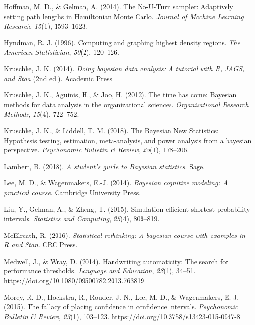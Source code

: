 \documentclass[,man,floatsintext]{apa6}
\begin{document}
\leavevmode\hypertarget{ref-hoffman2014no}{}%
Hoffman, M. D., \& Gelman, A. (2014). The No-U-Turn sampler: Adaptively setting path lengths in Hamiltonian Monte Carlo. \emph{Journal of Machine Learning Research}, \emph{15}(1), 1593--1623.

\leavevmode\hypertarget{ref-hyndman1996computing}{}%
Hyndman, R. J. (1996). Computing and graphing highest density regions. \emph{The American Statistician}, \emph{50}(2), 120--126.

\leavevmode\hypertarget{ref-kruschke2014doing}{}%
Kruschke, J. K. (2014). \emph{Doing bayesian data analysis: A tutorial with R, JAGS, and Stan} (2nd ed.). Academic Press.

\leavevmode\hypertarget{ref-kruschke2012time}{}%
Kruschke, J. K., Aguinis, H., \& Joo, H. (2012). The time has come: Bayesian methods for data analysis in the organizational sciences. \emph{Organizational Research Methods}, \emph{15}(4), 722--752.

\leavevmode\hypertarget{ref-kruschke2018bayesian}{}%
Kruschke, J. K., \& Liddell, T. M. (2018). The Bayesian New Statistics: Hypothesis testing, estimation, meta-analysis, and power analysis from a bayesian perspective. \emph{Psychonomic Bulletin \& Review}, \emph{25}(1), 178--206.

\leavevmode\hypertarget{ref-lambert2018student}{}%
Lambert, B. (2018). \emph{A student's guide to Bayesian statistics}. Sage.

\leavevmode\hypertarget{ref-lee2014bayesian}{}%
Lee, M. D., \& Wagenmakers, E.-J. (2014). \emph{Bayesian cognitive modeling: A practical course}. Cambridge University Press.

\leavevmode\hypertarget{ref-liu2015simulation}{}%
Liu, Y., Gelman, A., \& Zheng, T. (2015). Simulation-efficient shortest probability intervals. \emph{Statistics and Computing}, \emph{25}(4), 809--819.

\leavevmode\hypertarget{ref-mcelreath2016statistical}{}%
McElreath, R. (2016). \emph{Statistical rethinking: A bayesian course with examples in R and Stan}. CRC Press.

\leavevmode\hypertarget{ref-medwell2014handwriting}{}%
Medwell, J., \& Wray, D. (2014). Handwriting automaticity: The search for performance thresholds. \emph{Language and Education}, \emph{28}(1), 34--51. \url{https://doi.org/10.1080/09500782.2013.763819}

\leavevmode\hypertarget{ref-morey2015Fallacy}{}%
Morey, R. D., Hoekstra, R., Rouder, J. N., Lee, M. D., \& Wagenmakers, E.-J. (2015). The fallacy of placing confidence in confidence intervals. \emph{Psychonomic Bulletin \& Review}, \emph{23}(1), 103--123. \url{https://doi.org/10.3758/s13423-015-0947-8}
\end{document}
